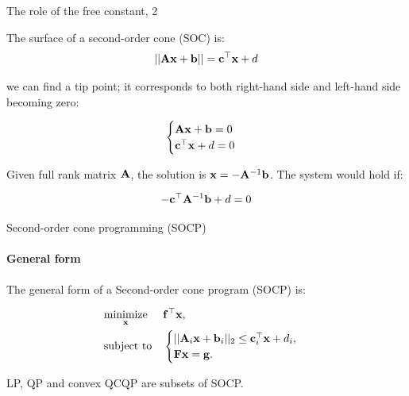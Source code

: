 \documentclass{beamer}
\begin{document}
\begin{frame}{The role of the free constant, 2}
	\begin{flushleft}
		
		The surface of a second-order cone (SOC) is:
		\begin{equation}
			||\mathbf{A}\mathbf{x}+\mathbf{b}|| = \mathbf{c}^\top \mathbf{x} + d
		\end{equation}
		
		we can find a tip point; it corresponds to both right-hand side and left-hand side becoming zero:
		
		\begin{equation}
			\begin{cases}
				\mathbf{A}\mathbf{x}+\mathbf{b} = 0 \\
				\mathbf{c}^\top \mathbf{x} + d = 0
			\end{cases}
		\end{equation}
		
		Given full rank matrix $\mathbf{A}$, the solution is $\mathbf{x} = -\mathbf{A}^{-1}\mathbf{b}$. The system would hold if:
		
		\begin{equation}
			-\mathbf{c}^\top \mathbf{A}^{-1}\mathbf{b} + d = 0
		\end{equation}
		
		
	\end{flushleft}
\end{frame}







\begin{frame}{Second-order cone programming (SOCP)}
\framesubtitle{General form}
\begin{flushleft}


The general form of a Second-order cone program (SOCP) is:

%
\begin{equation}
\begin{aligned}
& \underset{\mathbf{x}}{\text{minimize}}
& & \mathbf{f}^\top\mathbf{x}, \\
& \text{subject to}
& & \begin{cases}
    ||\mathbf{A}_i\mathbf{x} + \mathbf{b}_i||_2 \leq 
     \mathbf{c}_i^\top \mathbf{x} + d_i, \\
    \mathbf{F}\mathbf{x} = \mathbf{g}.
    \end{cases}
\end{aligned}
\end{equation}

LP, QP and convex QCQP are subsets of SOCP.
 
\end{flushleft}
\end{frame}
\end{document}
